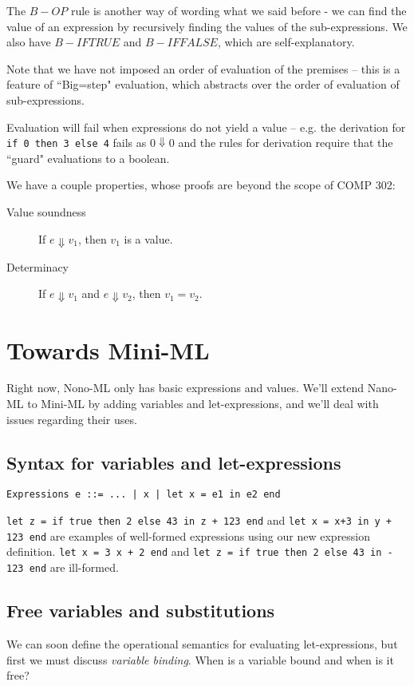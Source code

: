 \documentclass[11pt]{article}
\begin{document}
The $B-OP$ rule is another way of wording what we said before - we can find the value of an expression by recursively finding the values of the sub-expressions. We also have $B-IFTRUE$ and $B-IFFALSE$, which are self-explanatory.

Note that we have not imposed an order of evaluation of the premises -- this is a feature of ``Big=step" evaluation, which abstracts over the order of evaluation of sub-expressions.

Evaluation will fail when expressions do not yield a value -- e.g. the derivation for \verb~if 0 then 3 else 4~ fails as $0 \Downarrow 0$ and the rules for derivation require that the ``guard" evaluations to a boolean.

We have a couple properties, whose proofs are beyond the scope of COMP 302:
\begin{description}
    \item[Value soundness] If $e \Downarrow v_1$, then $v_1$ is a value.
    \item[Determinacy] If $e \Downarrow v_1$ and $e \Downarrow v_2$, then $v_1 = v_2$.
\end{description}

\section{Towards Mini-ML}
Right now, Nono-ML only has basic expressions and values. We'll extend Nano-ML to Mini-ML by adding variables and let-expressions, and we'll deal with issues regarding their uses.

\subsection{Syntax for variables and let-expressions}
\begin{verbatim}
Expressions e ::= ... | x | let x = e1 in e2 end
\end{verbatim}

\verb~let z = if true then 2 else 43 in z + 123 end~ and  \verb~let x = x+3 in y + 123 end~ are examples of well-formed expressions using our new expression definition. \verb~let x = 3 x + 2 end~ and \verb~let z = if true then 2 else 43 in - 123 end~ are ill-formed.

\subsection{Free variables and substitutions}
We can soon define the operational semantics for evaluating let-expressions, but first we must discuss \emph{variable binding}. When is a variable bound and when is it free?
\end{document}
